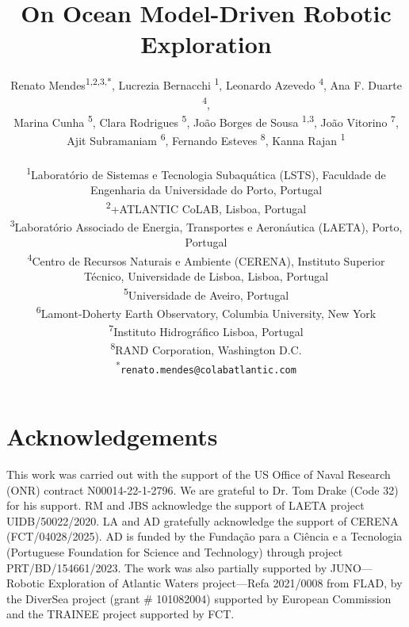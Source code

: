 \documentclass[11pt]{article}
\title{On Ocean Model-Driven Robotic Exploration}
\author{
Renato Mendes\textsuperscript{1,2,3,*},
Lucrezia Bernacchi \textsuperscript{1},
Leonardo Azevedo \textsuperscript{4},
Ana F. Duarte \textsuperscript{4},\\
Marina Cunha \textsuperscript{5},
Clara Rodrigues \textsuperscript{5},
Jo\~{a}o Borges de Sousa \textsuperscript{1,3},
Jo\~{a}o Vitorino \textsuperscript{7},\\
Ajit Subramaniam \textsuperscript{6},
Fernando Esteves \textsuperscript{8},
Kanna Rajan \textsuperscript{1}
\\
\\
\textsuperscript{1}{\scriptsize Laboratório de Sistemas e Tecnologia Subaquática (LSTS), Faculdade de Engenharia da Universidade do Porto, Portugal}\\
\textsuperscript{2}{\scriptsize +ATLANTIC CoLAB, Lisboa, Portugal}\\
\textsuperscript{3}{\scriptsize Laboratório Associado de Energia, Transportes e Aeronáutica (LAETA), Porto, Portugal}\\
\textsuperscript{4}{\scriptsize Centro de Recursos Naturais e Ambiente (CERENA), Instituto Superior T\'{e}cnico, Universidade de Lisboa, Lisboa, Portugal}\\
\textsuperscript{5}{\scriptsize Universidade de Aveiro, Portugal}\\
\textsuperscript{6}{\scriptsize Lamont-Doherty Earth Observatory, Columbia University, New York}\\
\textsuperscript{7}{\scriptsize Instituto Hidrogr{\'a}fico Lisboa, Portugal}\\
\textsuperscript{8}{\scriptsize RAND Corporation, Washington D.C.}\\
\textsuperscript{*}\texttt{{\scriptsize renato.mendes@colabatlantic.com}}
}
\date{}
\begin{document}
\maketitle







\section{Acknowledgements}

This work was carried out with the support of the US Office of Naval
Research (ONR) contract N00014-22-1-2796. We are grateful to Dr. Tom
Drake (Code 32) for his support. RM and JBS acknowledge the support of
LAETA project UIDB/50022/2020. LA and AD gratefully acknowledge the
support of CERENA (FCT/04028/2025). AD is funded by the
Funda\c{c}\~{a}o para a Ci\^{e}ncia e a Tecnologia (Portuguese
Foundation for Science and Technology) through project
PRT/BD/154661/2023. The work was also partially supported by
JUNO—Robotic Exploration of Atlantic Waters project—Refa 2021/0008
from FLAD, by the DiverSea project (grant \# 101082004) supported by
European Commission and the TRAINEE project supported by FCT.


\footnotesize{
  
}
\end{document}
